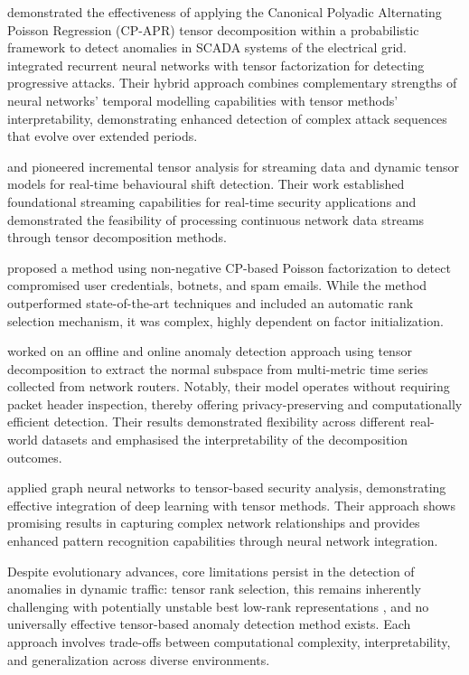 \documentclass{ieeeaccess}
\begin{document}
\cite{most2023electrical} demonstrated the effectiveness of applying the Canonical Polyadic Alternating Poisson Regression (CP-APR) tensor decomposition within a probabilistic framework to detect anomalies in SCADA systems of the electrical grid.  \cite{zhang2019hybrid} integrated recurrent neural networks with tensor factorization for detecting progressive attacks. Their hybrid approach combines complementary strengths of neural networks' temporal modelling capabilities with tensor methods' interpretability, demonstrating enhanced detection of complex attack sequences that evolve over extended periods.


\cite{sun2006incremental} and \cite{sun2006beyond} pioneered incremental tensor analysis for streaming data and dynamic tensor models for real-time behavioural shift detection. Their work established foundational streaming capabilities for real-time security applications and demonstrated the feasibility of processing continuous network data streams through tensor decomposition methods.


\cite{eren2023general} proposed a method using non-negative CP-based Poisson factorization to detect compromised user credentials, botnets, and spam emails. While the method outperformed state-of-the-art techniques and included an automatic rank selection mechanism, it was complex, highly dependent on factor initialization. 


\cite{streit2021network} worked on an offline and online anomaly detection approach using tensor decomposition to extract the normal subspace from multi-metric time series collected from network routers. Notably, their model operates without requiring packet header inspection, thereby offering privacy-preserving and computationally efficient detection. Their results demonstrated flexibility across different real-world datasets and emphasised the interpretability of the decomposition outcomes. 

\cite{wu2021graph} applied graph neural networks to tensor-based security analysis, demonstrating effective integration of deep learning with tensor methods. Their approach shows promising results in capturing complex network relationships and provides enhanced pattern recognition capabilities through neural network integration. 


Despite evolutionary advances, core limitations persist in the detection of anomalies in dynamic traffic: tensor rank selection, this remains inherently challenging with potentially unstable best low-rank representations \cite{kruskal1977three, kolda2009tensor}, and no universally effective tensor-based anomaly detection method exists. Each approach involves trade-offs between computational complexity, interpretability, and generalization across diverse environments. 
\end{document}
